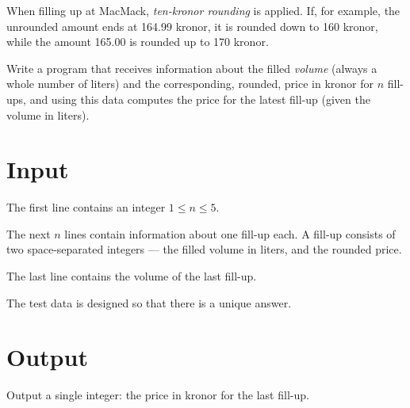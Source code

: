 
When filling up at MacMack, \emph{ten-kronor rounding} is applied. If, for example, the unrounded amount ends at 164.99 kronor, it is rounded down to 160 kronor, while the amount 165.00 is rounded up to 170 kronor.

Write a program that receives information about the filled \emph{volume} (always a whole number of liters) and the corresponding, rounded, price in kronor for $n$ fill-ups, and using this data computes the price for the latest fill-up (given the volume in liters).

\section*{Input}
The first line contains an integer $1 \le n \le 5$.

The next $n$ lines contain information about one fill-up each. A fill-up consists of two space-separated integers --- the filled volume in liters, and the rounded price.

The last line contains the volume of the last fill-up.

The test data is designed so that there is a unique answer.

\section*{Output}
Output a single integer: the price in kronor for the last fill-up.
